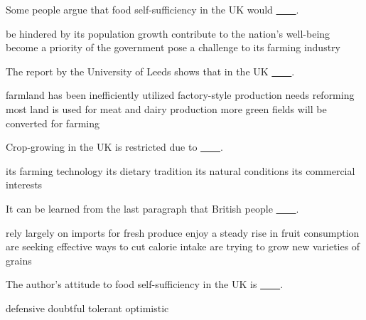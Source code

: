\item Some people argue that food self-sufficiency in the UK would \uline{~~~~}.
\begin{tasks}
	\task be hindered by its population growth
	\task contribute to the nation's well-being
	\task become a priority of the government
	\task pose a challenge to its farming industry
\end{tasks}
\item The report by the University of Leeds shows that in the UK \uline{~~~~}.
\begin{tasks}
	\task farmland has been inefficiently utilized
	\task factory-style production needs reforming
	\task most land is used for meat and dairy production
	\task more green fields will be converted for farming
\end{tasks}
\item Crop-growing in the UK is restricted due to \uline{~~~~}.
\begin{tasks}
	\task its farming technology
	\task its dietary tradition
	\task its natural conditions
	\task its commercial interests
\end{tasks}
\item It can be learned from the last paragraph that British people \uline{~~~~}.
\begin{tasks}
	\task rely largely on imports for fresh produce
	\task enjoy a steady rise in fruit consumption
	\task are seeking effective ways to cut calorie intake
	\task are trying to grow new varieties of grains
\end{tasks}
\item The author's attitude to food self-sufficiency in the UK is \uline{~~~~}.
\begin{tasks}
	\task defensive
	\task doubtful
	\task tolerant
	\task optimistic
\end{tasks}